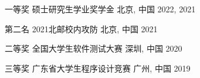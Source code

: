 



\begin{cvhonors}
  \cvhonor
    {一等奖} %
    {硕士研究生学业奖学金} %
    {北京, 中国} %
    {2022, 2021} %

  \cvhonor
    {第二名} %
    {2021北邮校内攻防} %
    {北京, 中国} %
    {2021} %

  \cvhonor
    {二等奖} %
    {全国大学生软件测试大赛} %
    {深圳, 中国} %
    {2020} %


  \cvhonor
    {三等奖} %
    {广东省大学生程序设计竞赛} %
    {广州, 中国} %
    {2019} %


\end{cvhonors}
